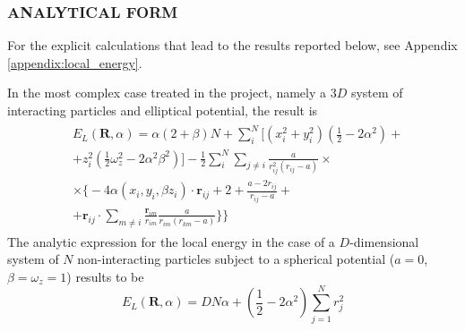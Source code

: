 \subsubsection{ANALYTICAL FORM} \label{sec: 3.2.1 Analytical form}
For the explicit calculations that lead to the results reported below, see Appendix \ref{appendix:local_energy}. 

In the most complex case treated in the project, namely a $3D$ system of interacting particles and elliptical potential, the result is
\begin{align}
\begin{split}
    &E_L(\bm{R}, \alpha) = \alpha (2 + \beta) N + \sum_i^N \bigg[ (x_i^2 + y_i^2)\left(\frac{1}{2} - 2\alpha^2 \right) + \\
    & + z_i^2\left( \frac{1}{2} \omega_z^2 - 2\alpha^2\beta^2 \right) \bigg] -  \frac{1}{2} \sum_i^N \sum_{j\neq i} \frac{a}{r_{ij}^2 (r_{ij} - a)} \times \\
    &\times \bigg\{ -4 \alpha \left( x_i, y_i, \beta z_i \right) \cdot \mathbf{r}_{ij} + 2 + \frac{a - 2r_{ij}}{ r_{ij} - a } + \\
    &+ \mathbf{r}_{ij} \cdot \sum_{m \neq i}   \frac{\mathbf{r}_{im}}{r_{im}} \frac{a}{r_{im} \left( r_{km} - a \right)} \bigg\} \bigg\}
\end{split}
\label{local_energy_analitic_interacting}
\end{align}
The analytic expression for the local energy in the case of a $D$-dimensional system of $N$ non-interacting particles subject to a spherical potential ($a=0$, $\beta= \omega_z=1$) results to be
\begin{equation}
    E_L(\bm{R}, \alpha) = D N \alpha + \left( \frac{1}{2} - 2\alpha^2 \right) \sum_{j=1}^{N}  r_j^2
    \label{local_energy_analytic_noninteracting}
\end{equation}




